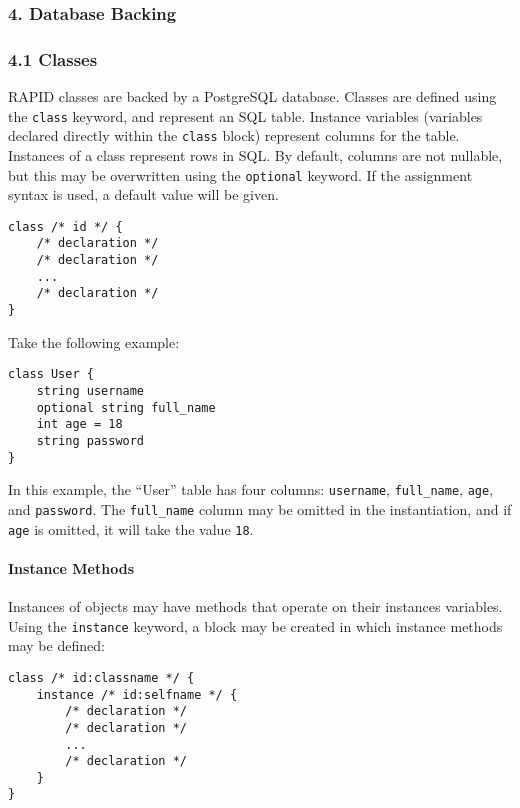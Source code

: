 \subsubsection*{4. Database Backing}\label{database-backing}

\subsubsection*{4.1 Classes}\label{classes}

RAPID classes are backed by a PostgreSQL database. Classes are defined
using the \texttt{class} keyword, and represent an SQL table. Instance
variables (variables declared directly within the \texttt{class} block)
represent columns for the table. Instances of a class represent rows in
SQL. By default, columns are not nullable, but this may be overwritten
using the \texttt{optional} keyword. If the assignment syntax is used, a
default value will be given.

\begin{verbatim}
class /* id */ {
    /* declaration */
    /* declaration */
    ...
    /* declaration */
}
\end{verbatim}

Take the following example:

\begin{verbatim}
class User {
    string username
    optional string full_name
    int age = 18
    string password
}
\end{verbatim}

In this example, the ``User'' table has four columns: \texttt{username},
\texttt{full\_name}, \texttt{age}, and \texttt{password}. The
\texttt{full\_name} column may be omitted in the instantiation, and if
\texttt{age} is omitted, it will take the value \texttt{18}.

\paragraph{Instance Methods}\label{instance-methods}

Instances of objects may have methods that operate on their instances
variables. Using the \texttt{instance} keyword, a block may be created
in which instance methods may be defined:

\begin{verbatim}
class /* id:classname */ {
    instance /* id:selfname */ {
        /* declaration */
        /* declaration */
        ...
        /* declaration */
    }
}
\end{verbatim}

